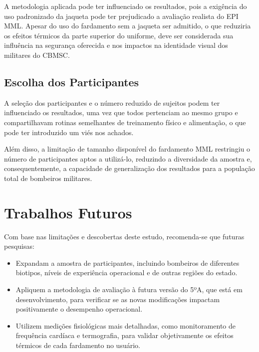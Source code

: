             A metodologia aplicada pode ter influenciado os resultados, pois a exigência do uso 
            padronizado da jaqueta pode ter prejudicado a avaliação realista do \acrshort{EPI} \acrshort{MML}.
            Apesar do uso do fardamento sem a jaqueta ser admitido, o que reduziria os efeitos térmicos da parte 
            superior do uniforme, deve ser considerada sua influência na segurança oferecida e 
            nos impactos na identidade visual dos militares do \acrshort{CBMSC}.
        
        \subsection{Escolha dos Participantes}
            A seleção dos participantes e o número reduzido de sujeitos podem ter influenciado os 
            resultados, uma vez que todos pertenciam ao mesmo grupo e compartilhavam rotinas 
            semelhantes de treinamento físico e alimentação, o que pode ter introduzido um viés nos achados.

            Além disso, a limitação de tamanho disponível do fardamento \acrshort{MML} restringiu o número de 
            participantes aptos a utilizá-lo, reduzindo a diversidade da amostra e, consequentemente, 
            a capacidade de generalização dos resultados para a população total de bombeiros militares.
        
    \section{Trabalhos Futuros}
        Com base nas limitações e descobertas deste estudo, recomenda-se que futuras pesquisas:

        \begin{itemize}
            \item Expandam a amostra de participantes, incluindo bombeiros de diferentes biotipos, 
            níveis de experiência operacional e de outras regiões do estado.
            \item Apliquem a metodologia de avaliação à futura versão do 5ºA, que está em desenvolvimento, 
            para verificar se as novas modificações impactam positivamente o desempenho operacional.
            \item Utilizem medições fisiológicas mais detalhadas, como monitoramento de frequência 
            cardíaca e termografia, para validar objetivamente os efeitos térmicos de cada fardamento no usuário.
        \end{itemize}